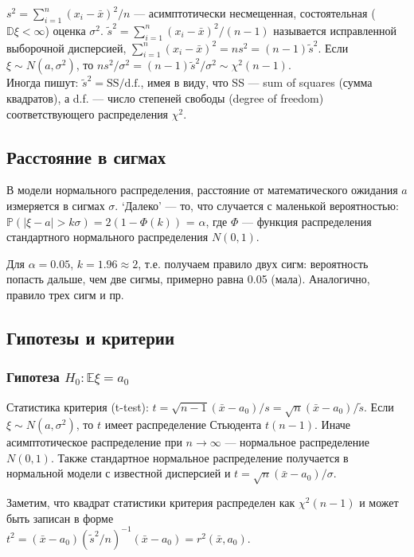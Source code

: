\documentclass[12 pt]{article}
\def\E{\mathbb{E}}
\def\P{\mathbb{P}}
\def\D{\mathbb{D}}
\begin{document}
$s^2=\sum_{i=1}^n (x_i-\bar{x})^2/n$ --- асимптотически несмещенная, состоятельная ($\D \xi < \infty$) оценка $\sigma^2$.
$\widetilde{s}^2=\sum_{i=1}^{n} (x_i-\bar{x})^2/(n-1)$ называется исправленной выборочной дисперсией,
$\sum_{i=1}^n (x_i-\bar{x})^2 = n s^2 = (n-1)\widetilde{s}^2$.
Если $\xi\sim N(a,\sigma^2)$, то $n s^2 / \sigma^2 = (n-1) \widetilde{s}^2 / \sigma^2 \sim \chi^2(n-1)$. \\
Иногда пишут: $\widetilde{s}^2 = \mbox{SS}/\mbox{d.f.}$, имея в виду, что SS --- sum of squares (сумма квадратов),
а d.f. --- число степеней свободы (degree of freedom) соответствующего распределения $\chi^2$.

\subsection*{Расстояние в сигмах}
В модели нормального распределения, расстояние от математического ожидания $a$ измеряется в сигмах $\sigma$.
`Далеко' --- то, что случается с маленькой вероятностью:\\
$\P(|\xi-a|>k\sigma) = 2(1-\Phi(k))$ = $\alpha$, где $\Phi$ --- функция распределения стандартного нормального распределения
$N(0,1)$.

Для $\alpha = 0.05$, $k=1.96\approx 2$, т.е. получаем правило двух сигм: вероятность попасть дальше, чем две сигмы, примерно равна 0.05 (мала).
Аналогично, правило трех сигм и пр.

\subsection*{Гипотезы и критерии}

\subsubsection*{Гипотеза $H_0: \E\xi = a_0$}

Статистика критерия (t-test): $t=\sqrt{n-1}(\bar{x}-a_0) / s = \sqrt{n}(\bar{x}-a_0) / \widetilde{s} $.
Если $\xi\sim N(a,\sigma^2)$, то $t$ имеет распределение Стьюдента $t(n-1)$. Иначе асимптотическое распределение
при $n\rightarrow \infty$ --- нормальное распределение $N(0,1)$. Также стандартное нормальное распределение получается
в нормальной модели с известной дисперсией и $t= \sqrt{n}(\bar{x}-a_0) / \sigma$.

Заметим, что квадрат статистики критерия распределен как $\chi^2(n-1)$ и может быть записан в форме\\
$t^2 = (\bar{x}-a_0)\left(\widetilde{s}^2/n\right)^{-1} (\bar{x}-a_0) = r^2(\bar{x},a_0)$.
\end{document}
